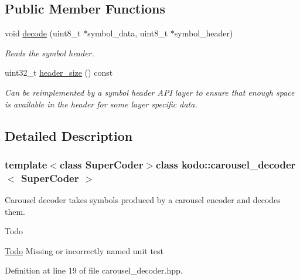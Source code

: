 \subsection*{Public Member Functions}
\begin{DoxyCompactItemize}
\item 
void \hyperlink{classkodo_1_1carousel__decoder_a20021ea31a5800a40363ec04ca6dc653}{decode} (uint8\-\_\-t $\ast$symbol\-\_\-data, uint8\-\_\-t $\ast$symbol\-\_\-header)
\begin{DoxyCompactList}\small\item\em Reads the symbol header. \end{DoxyCompactList}\item 
uint32\-\_\-t \hyperlink{classkodo_1_1carousel__decoder_ab129f046d2c84d50596ccbfaf50dbee9}{header\-\_\-size} () const 
\begin{DoxyCompactList}\small\item\em Can be reimplemented by a symbol header A\-P\-I layer to ensure that enough space is available in the header for some layer specific data. \end{DoxyCompactList}\end{DoxyCompactItemize}


\subsection{Detailed Description}
\subsubsection*{template$<$class Super\-Coder$>$class kodo\-::carousel\-\_\-decoder$<$ Super\-Coder $>$}

Carousel decoder takes symbols produced by a carousel encoder and decodes them. 

\begin{DoxyRefDesc}{Todo}
\item[\hyperlink{todo__todo000025}{Todo}]Missing or incorrectly named unit test\end{DoxyRefDesc}


Definition at line 19 of file carousel\-\_\-decoder.\-hpp.




